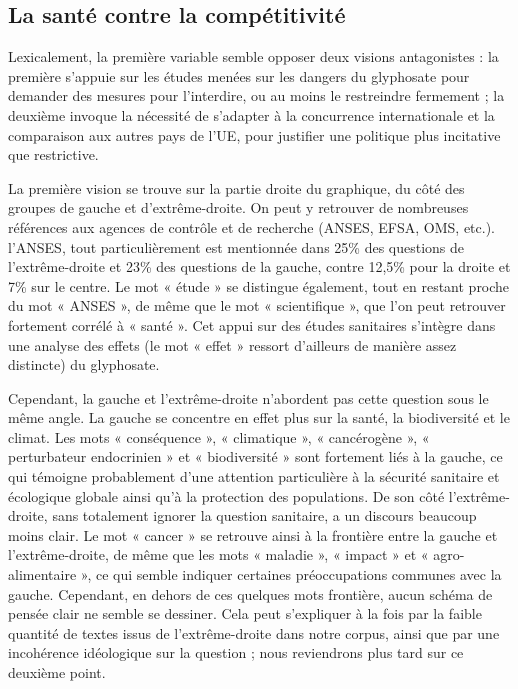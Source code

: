 \documentclass[12pt,twocolumn,landscape]{article}
\begin{document}
    \subsection{La santé contre la compétitivité}\label{subsec:la-sante-contre-la-competitivite}

    Lexicalement, la première variable semble opposer deux
    visions antagonistes : la première s'appuie sur
    les études menées sur les dangers du glyphosate pour demander
    des mesures pour l'interdire, ou au moins le restreindre
    fermement ; la deuxième invoque la nécessité
    de s'adapter à la concurrence internationale et la comparaison
    aux autres pays de l'UE, pour justifier une politique
    plus incitative que restrictive.

    La première vision se trouve sur la partie droite
    du graphique, du côté des groupes de gauche et d'extrême-droite.
    On peut y retrouver de nombreuses références aux agences
    de contrôle et de recherche (ANSES, EFSA, OMS, etc.).
    l'ANSES, tout particulièrement
    est mentionnée dans 25\% des questions de l'extrême-droite
    et 23\% des questions de la gauche, contre 12,5\%
    pour la droite et 7\% sur le centre.
    Le mot « étude » se distingue également, tout en restant
    proche du mot « ANSES », de même que le mot « scientifique »,
    que l'on peut retrouver fortement corrélé à « santé ».
    Cet appui sur des études sanitaires s'intègre dans une analyse
    des effets (le mot « effet » ressort d'ailleurs de manière assez distincte)
    du glyphosate.

    Cependant, la gauche et l'extrême-droite n'abordent pas
    cette question sous le même angle.
    La gauche se concentre en effet plus sur la santé,
    la biodiversité et le climat.
    Les mots « conséquence », « climatique », « cancérogène »,
    « perturbateur endocrinien » et « biodiversité »
    sont fortement liés à la gauche, ce qui témoigne
    probablement d'une attention particulière à la
    sécurité sanitaire et écologique globale
    ainsi qu'à la protection des populations.
    De son côté l'extrême-droite,
    sans totalement ignorer la question sanitaire, a un discours
    beaucoup moins clair.
    Le mot « cancer » se retrouve ainsi à la frontière entre la gauche
    et l'extrême-droite, de même que les mots « maladie »,
    « impact » et « agro-alimentaire », ce qui semble indiquer
    certaines préoccupations communes avec la gauche.
    Cependant, en dehors de ces quelques mots frontière,
    aucun schéma de pensée clair ne semble se dessiner.
    Cela peut s'expliquer à la fois par la faible quantité
    de textes issus de l'extrême-droite dans notre corpus,
    ainsi que par une incohérence idéologique sur la question ;
    nous reviendrons plus tard sur ce deuxième point.
\end{document}
